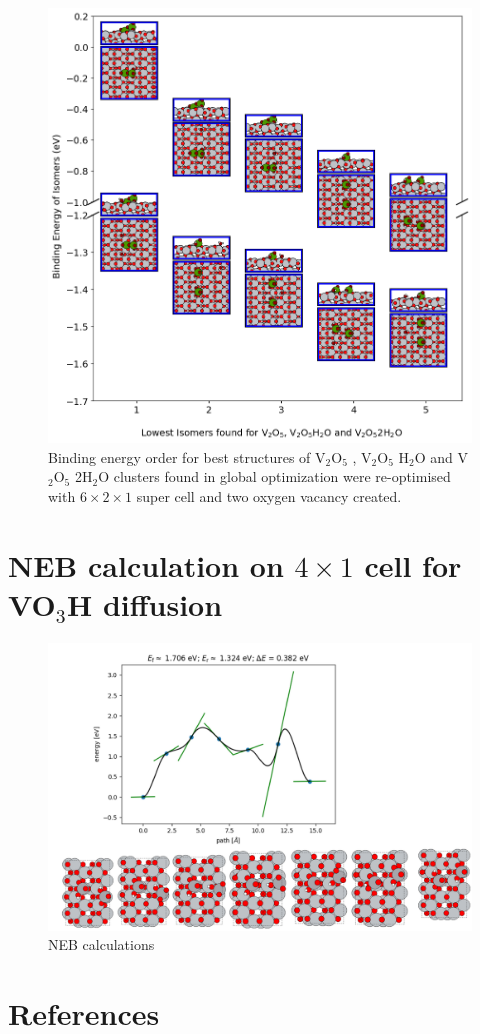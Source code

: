 \documentclass[aip,amsmath,amssymb,reprint, jcp]{revtex4-1}
\begin{document}
\begin{figure}
\centering
\includegraphics[width=1.0\textwidth]{BE_order_2Ov_V2O5clu_TiO2_101sur.png}
\caption{Binding energy order for best structures of V$_2$O$_5$ , V$_2$O$_5$ H$_2$O and V$_2$O$_5$ 2H$_2$O clusters found in global optimization were re-optimised with $6 \times 2 \times 1$ super cell  and  two oxygen vacancy created.}
\label{fig:BE_1Ov}
\end{figure}
\section{NEB calculation on $4\times 1$ cell for VO$_3$H diffusion}
\begin{figure}
\centering
\includegraphics[width=1.0\textwidth]{NEB_calculation_4by1cell_2VO3Hdiffusion.png}
\caption{NEB calculations}
\label{fig:BE_1Ov}
\end{figure}
\section{References}

\end{document}
